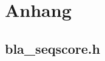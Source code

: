 \documentclass{article}
\begin{document}
{}

\pagebreak
\section{Anhang}
\subsection*{bla\_seqscore.h}

\end{document}
